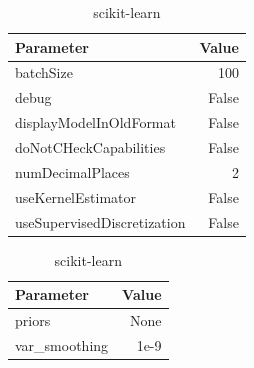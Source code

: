 \begin{table}[H]
    \footnotesize
    \centering
    \caption{NaïveBayes classifier used parameters in Weka and scikit-learn} \label{tab:nb_param}
    \begin{subtable}[t]{0.5\linewidth}
        \caption{weka \cite{noauthor_naivebayes_nodate}}
        \centering
        \begin{tabular}{lr}\toprule
            Parameter & Value \\\midrule
            batchSize & 100 \\
            debug & False \\
            displayModelInOldFormat & False \\
            doNotCHeckCapabilities & False \\
            numDecimalPlaces & 2 \\
            useKernelEstimator & False \\
            useSupervisedDiscretization & False\\\bottomrule
        \end{tabular}
    \end{subtable}%
    \begin{subtable}[t]{.5\linewidth}
        \caption{scikit-learn \cite{noauthor_sklearnnaive_bayesgaussiannb_nodate}}
        \centering
        \begin{tabular}{lr}\toprule
            Parameter & Value \\\midrule
            priors & None \\
            var\_smoothing & 1e-9 \\\bottomrule
        \end{tabular}
    \end{subtable}%
\end{table}

